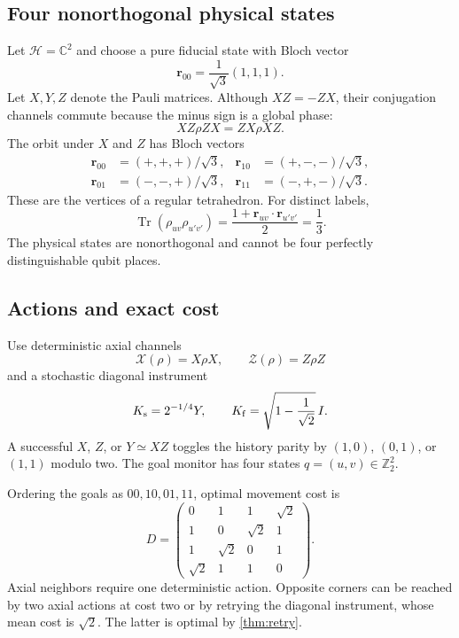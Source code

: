 \documentclass[11pt]{article}
\theoremstyle{definition}
\theoremstyle{remark}
\newcommand{\C}{\mathbb C}
\newcommand{\Z}{\mathbb Z}
\newcommand{\Tr}{\operatorname{Tr}}
\begin{document}
\subsection{Four nonorthogonal physical states}

Let $\mathcal H=\C^2$ and choose a pure fiducial state with Bloch vector
\begin{equation}
  \bm r_{00}=\frac1{\sqrt3}(1,1,1).
\end{equation}
Let $X,Y,Z$ denote the Pauli matrices. Although $XZ=-ZX$, their conjugation
channels commute because the minus sign is a global phase:
\begin{equation}
  XZ\rho ZX=ZX\rho XZ.
\end{equation}
The orbit under $X$ and $Z$ has Bloch vectors
\begin{align}
 \bm r_{00}&=(+,+,+)/\sqrt3,&
 \bm r_{10}&=(+,-,-)/\sqrt3,\nonumber\\
 \bm r_{01}&=(-,-,+)/\sqrt3,&
 \bm r_{11}&=(-,+,-)/\sqrt3.
 \label{eq:pauli-orbit}
\end{align}
These are the vertices of a regular tetrahedron. For distinct labels,
\begin{equation}
 \Tr(\rho_{uv}\rho_{u'v'})
 =\frac{1+\bm r_{uv}\cdot\bm r_{u'v'}}2
 =\frac13.
 \label{eq:tetra-overlap}
\end{equation}
The physical states are nonorthogonal and cannot be four perfectly
distinguishable qubit places.

\subsection{Actions and exact cost}

Use deterministic axial channels
\begin{equation}
 \mathcal X(\rho)=X\rho X,\qquad
 \mathcal Z(\rho)=Z\rho Z
\end{equation}
and a stochastic diagonal instrument
\begin{equation}
 K_{\rm s}=2^{-1/4}Y,\qquad
 K_{\rm f}=\sqrt{1-\frac1{\sqrt2}}\,I.
 \label{eq:pauli-diagonal}
\end{equation}
A successful $X$, $Z$, or $Y\simeq XZ$ toggles the history parity by
$(1,0)$, $(0,1)$, or $(1,1)$ modulo two. The goal monitor has four states
$q=(u,v)\in\Z_2^2$.

Ordering the goals as $00,10,01,11$, optimal movement cost is
\begin{equation}
D=
\begin{pmatrix}
0&1&1&\sqrt2\\
1&0&\sqrt2&1\\
1&\sqrt2&0&1\\
\sqrt2&1&1&0
\end{pmatrix}.
\label{eq:pauli-cost}
\end{equation}
Axial neighbors require one deterministic action. Opposite corners can be
reached by two axial actions at cost two or by retrying the diagonal
instrument, whose mean cost is $\sqrt2$. The latter is optimal by
\cref{thm:retry}.
\end{document}
